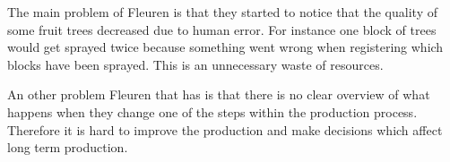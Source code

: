 The main problem of Fleuren is that they started to notice that the quality of some fruit trees decreased due to human error. For instance  one block of trees would get sprayed twice because something went wrong when registering which blocks have been sprayed. This is an unnecessary waste of resources.

An other problem Fleuren that has is that there is no clear overview of what happens when they change one of the steps within the production process. Therefore it is hard to improve the production and make decisions which affect long term production.